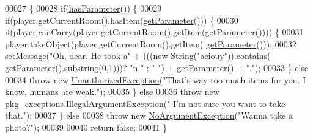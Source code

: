 \begin{DoxyCode}
00027                                                                                                            
                              \{
00028         \textcolor{keywordflow}{if}(\hyperlink{classpkg__commands_1_1Command_a02af95ab3f1898a66259ab7c177b6998}{hasParameter}()) \{
00029             \textcolor{keywordflow}{if}(player.getCurrentRoom().hasItem(\hyperlink{classpkg__commands_1_1Command_a41c92d445be73ea9d62320c65efb8434}{getParameter}())) \{
00030                 \textcolor{keywordflow}{if}(player.canCarry(player.getCurrentRoom().getItem(\hyperlink{classpkg__commands_1_1Command_a41c92d445be73ea9d62320c65efb8434}{getParameter}()))) \{
00031                     player.takeObject(player.getCurrentRoom().getItem(
      \hyperlink{classpkg__commands_1_1Command_a41c92d445be73ea9d62320c65efb8434}{getParameter}()));
00032                     \hyperlink{classpkg__commands_1_1Command_ae210ff216fe908b111ba1c988a963d13}{setMessage}(\textcolor{stringliteral}{"Oh, dear. He took a"} + (((\textcolor{keyword}{new} String(\textcolor{stringliteral}{"aeiouy"})).contains(
      \hyperlink{classpkg__commands_1_1Command_a41c92d445be73ea9d62320c65efb8434}{getParameter}().substring(0,1)))? \textcolor{stringliteral}{"n "} : \textcolor{stringliteral}{" "}) + \hyperlink{classpkg__commands_1_1Command_a41c92d445be73ea9d62320c65efb8434}{getParameter}() + \textcolor{stringliteral}{"."});
00033                 \} \textcolor{keywordflow}{else}
00034                     \textcolor{keywordflow}{throw} \textcolor{keyword}{new} \hyperlink{classpkg__exceptions_1_1UnauthorizedException}{UnauthorizedException}(\textcolor{stringliteral}{"That's way too much items for
       you. I know, humans are weak."});
00035             \} \textcolor{keywordflow}{else}
00036                 \textcolor{keywordflow}{throw} \textcolor{keyword}{new} \hyperlink{classpkg__exceptions_1_1IllegalArgumentException}{pkg\_exceptions.IllegalArgumentException}(\textcolor{stringliteral}{"
      I'm not sure you want to take that."});
00037         \} \textcolor{keywordflow}{else}
00038             \textcolor{keywordflow}{throw} \textcolor{keyword}{new} \hyperlink{classpkg__exceptions_1_1NoArgumentException}{NoArgumentException}(\textcolor{stringliteral}{"Wanna take a photo?"});
00039 
00040         \textcolor{keywordflow}{return} \textcolor{keyword}{false};
00041     \}
\end{DoxyCode}



